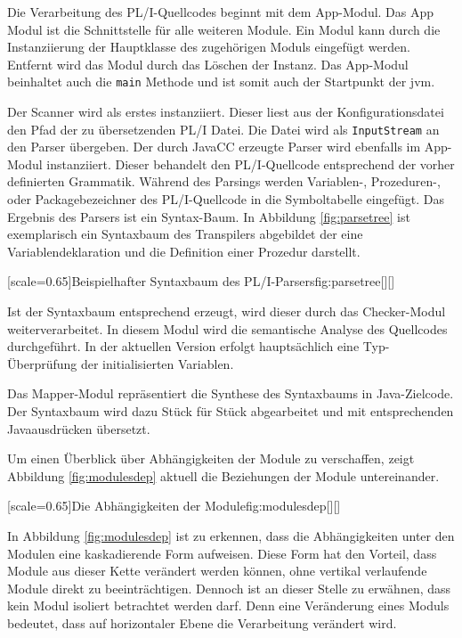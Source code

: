 Die Verarbeitung des PL/I-Quellcodes beginnt mit dem App-Modul. Das App Modul ist die Schnittstelle für alle weiteren Module. Ein Modul kann durch die Instanziierung der Hauptklasse des zugehörigen Moduls eingefügt werden. Entfernt wird das Modul durch das Löschen der Instanz. Das App-Modul beinhaltet auch die \verb+main+ Methode und ist somit auch der Startpunkt der \ac{jvm}.

Der Scanner wird als erstes instanziiert. Dieser liest aus der Konfigurationsdatei den Pfad der zu übersetzenden PL/I Datei. Die Datei wird als \verb+InputStream+ an den Parser übergeben.
Der durch JavaCC erzeugte Parser wird ebenfalls im App-Modul instanziiert. Dieser behandelt den PL/I-Quellcode entsprechend der vorher definierten Grammatik.  Während des Parsings werden Variablen-, Prozeduren-, oder Packagebezeichner des PL/I-Quellcode in die Symboltabelle eingefügt. Das Ergebnis des Parsers ist ein Syntax-Baum. 
\pagebreak
In Abbildung \ref{fig:parsetree} ist exemplarisch ein Syntaxbaum des Transpilers abgebildet der eine Variablendeklaration und die Definition einer Prozedur darstellt.

[scale=0.65]{Beispielhafter Syntaxbaum des PL/I-Parsers}{fig:parsetree}[][]

Ist der Syntaxbaum entsprechend erzeugt, wird dieser durch das Checker-Modul weiterverarbeitet. In diesem Modul wird die semantische Analyse des Quellcodes durchgeführt. In der aktuellen Version erfolgt hauptsächlich eine Typ-Überprüfung der initialisierten Variablen.

Das Mapper-Modul repräsentiert die Synthese des Syntaxbaums in Java-Zielcode. Der Syntaxbaum wird dazu Stück für Stück abgearbeitet und mit entsprechenden Javaausdrücken übersetzt.

Um einen Überblick über Abhängigkeiten der Module zu verschaffen, zeigt
Abbildung \ref{fig:modulesdep} aktuell die Beziehungen der Module untereinander.

[scale=0.65]{Die Abhängigkeiten der Module}{fig:modulesdep}[][]
\pagebreak

In Abbildung \ref{fig:modulesdep} ist zu erkennen, dass die Abhängigkeiten unter den Modulen eine kaskadierende Form aufweisen.
Diese Form hat den Vorteil, dass Module aus dieser Kette verändert werden können, ohne vertikal verlaufende Module direkt zu beeinträchtigen.
Dennoch ist an dieser Stelle zu erwähnen, dass kein Modul isoliert betrachtet werden darf. Denn eine Veränderung eines Moduls bedeutet, dass auf horizontaler 
Ebene die Verarbeitung verändert wird.

